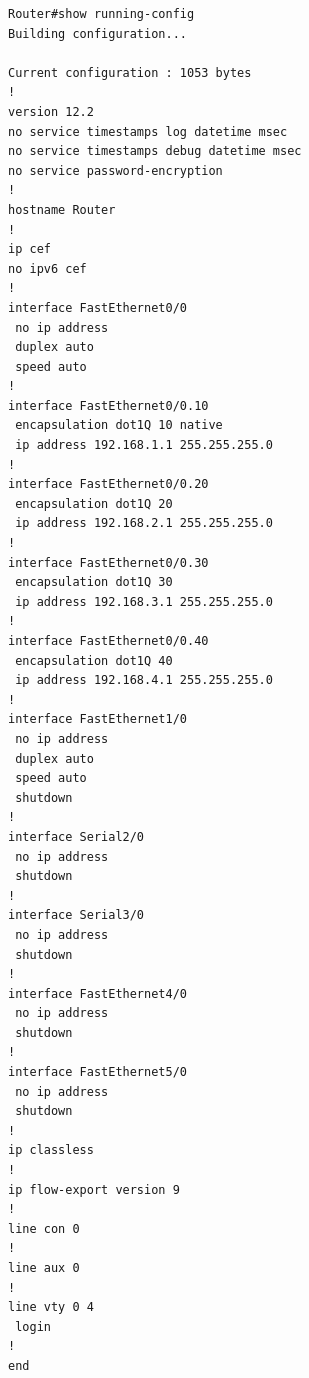 \documentclass{article}
\begin{document}
\begin{verbatim}
Router#show running-config 
Building configuration...

Current configuration : 1053 bytes
!
version 12.2
no service timestamps log datetime msec
no service timestamps debug datetime msec
no service password-encryption
!
hostname Router
!
ip cef
no ipv6 cef
!
interface FastEthernet0/0
 no ip address
 duplex auto
 speed auto
!
interface FastEthernet0/0.10
 encapsulation dot1Q 10 native
 ip address 192.168.1.1 255.255.255.0
!
interface FastEthernet0/0.20
 encapsulation dot1Q 20
 ip address 192.168.2.1 255.255.255.0
!
interface FastEthernet0/0.30
 encapsulation dot1Q 30
 ip address 192.168.3.1 255.255.255.0
!
interface FastEthernet0/0.40
 encapsulation dot1Q 40
 ip address 192.168.4.1 255.255.255.0
!
interface FastEthernet1/0
 no ip address
 duplex auto
 speed auto
 shutdown
!
interface Serial2/0
 no ip address
 shutdown
!
interface Serial3/0
 no ip address
 shutdown
!
interface FastEthernet4/0
 no ip address
 shutdown
!
interface FastEthernet5/0
 no ip address
 shutdown
!
ip classless
!
ip flow-export version 9
!
line con 0
!
line aux 0
!
line vty 0 4
 login
!
end
\end{verbatim}
\end{document}
